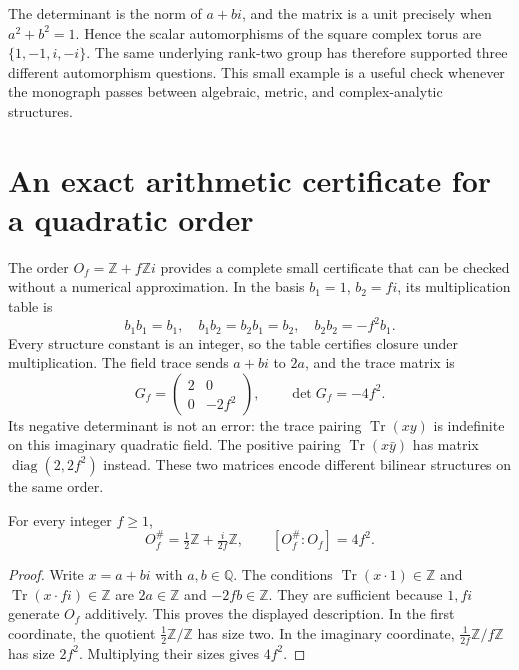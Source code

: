 The determinant is the norm of $a+bi$, and the matrix is a
unit precisely when $a^2+b^2=1$. Hence the scalar automorphisms
of the square complex torus are $\{1,-1,i,-i\}$. The same
underlying rank-two group has therefore supported three different
automorphism questions. This small example is a useful check
whenever the monograph passes between algebraic, metric, and
complex-analytic structures.

\section{An exact arithmetic certificate for a quadratic order}

The order $O_f=\mathbb Z+f\mathbb Z i$ provides a complete
small certificate that can be checked without a numerical
approximation. In the basis $b_1=1$, $b_2=fi$, its multiplication
table is
\[
 b_1b_1=b_1,\quad b_1b_2=b_2b_1=b_2,
 \quad b_2b_2=-f^2b_1.
\]
Every structure constant is an integer, so the table certifies
closure under multiplication. The field trace sends
$a+bi$ to $2a$, and the trace matrix is
\[
 G_f=\begin{pmatrix}2&0\\0&-2f^2\end{pmatrix},
 \qquad \det G_f=-4f^2.
\]
Its negative determinant is not an error: the trace pairing
$\operatorname{Tr}(xy)$ is indefinite on this imaginary
quadratic field. The positive pairing
$\operatorname{Tr}(x\bar y)$ has matrix
$\operatorname{diag}(2,2f^2)$ instead. These two matrices encode
different bilinear structures on the same order.

\begin{proposition}
For every integer $f\ge1$,
\[
 O_f^{\#}=\tfrac12\mathbb Z+\tfrac{i}{2f}\mathbb Z,
 \qquad [O_f^{\#}:O_f]=4f^2.
\]
\end{proposition}

\begin{proof}
Write $x=a+bi$ with $a,b\in\mathbb Q$. The conditions
$\operatorname{Tr}(x\cdot1)\in\mathbb Z$ and
$\operatorname{Tr}(x\cdot fi)\in\mathbb Z$ are
$2a\in\mathbb Z$ and $-2fb\in\mathbb Z$. They are
sufficient because $1,fi$ generate $O_f$ additively. This
proves the displayed description. In the first coordinate,
the quotient $\tfrac12\mathbb Z/\mathbb Z$ has size two.
In the imaginary coordinate,
$\tfrac1{2f}\mathbb Z/f\mathbb Z$ has size $2f^2$.
Multiplying their sizes gives $4f^2$.
\end{proof}

